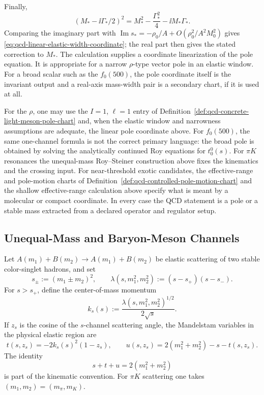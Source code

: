 Finally,
\[
  (M_\ast-\ii\Gamma_\ast/2)^2
  =
  M_\ast^2-\frac{\Gamma_\ast^2}{4}-\ii M_\ast\Gamma_\ast.
\]
Comparing the imaginary part with
\(\operatorname{Im}s_\ast=-\rho_0/A+O(\rho_0^2/A^2M_0^2)\) gives
\eqref{eq:qcd-linear-elastic-width-coordinate}; the real part then gives the
stated correction to \(M_\ast\).  The calculation supplies a coordinate
linearization of the pole equation.  It is appropriate for a narrow
\(\rho\)-type vector pole in an elastic window.  For a broad scalar such as
the \(f_0(500)\), the pole coordinate itself is the invariant output and a
real-axis mass-width pair is a secondary chart, if it is used at all.
\begin{remark}
For the \(\rho\), one may use the \(I=1\), \(\ell=1\) entry of
Definition~\ref{def:qcd-concrete-light-meson-pole-chart} and, when the
elastic window and narrowness assumptions are adequate, the linear pole
coordinate above.
For \(f_0(500)\), the same one-channel formula is not the correct primary
language: the broad pole is obtained by solving the analytically continued
Roy equations for \(t_0^0(s)\).  For \(\pi K\) resonances the unequal-mass
Roy--Steiner construction above fixes the kinematics and the crossing input.
For near-threshold exotic candidates, the effective-range and pole-motion
charts of Definition~\ref{def:qcd-controlled-pole-motion-chart} and the
shallow effective-range calculation above specify
what is meant by a molecular or compact coordinate.  In every case the QCD
statement is a pole or a stable mass extracted from a declared operator and
regulator setup.
\end{remark}

\subsection{Unequal-Mass and Baryon-Meson Channels}
\label{subsec:qcd-unequal-mass-baryon-meson-channels}

\begin{definition}
\label{def:qcd-unequal-mass-elastic-kinematics}
Let \(A(m_1)+B(m_2)\to A(m_1)+B(m_2)\) be elastic scattering of two stable
color-singlet hadrons, and set
\[
  s_\pm:=(m_1\pm m_2)^2,\qquad
  \lambda(s,m_1^2,m_2^2):=(s-s_+)(s-s_-).
\]
For \(s>s_+\), define the center-of-mass momentum
\[
  k_s(s):=\frac{\lambda(s,m_1^2,m_2^2)^{1/2}}{2\sqrt s}.
\]
If \(z_s\) is the cosine of the \(s\)-channel scattering angle, the
Mandelstam variables in the physical elastic region are
\begin{equation}
  t(s,z_s)=-2k_s(s)^2(1-z_s),
  \qquad
  u(s,z_s)=2(m_1^2+m_2^2)-s-t(s,z_s).
  \label{eq:qcd-unequal-mass-elastic-kinematics}
\end{equation}
The identity
\begin{equation}
  s+t+u=2(m_1^2+m_2^2)
  \label{eq:qcd-pik-mandelstam-sum}
\end{equation}
is part of the kinematic convention.  For \(\pi K\) scattering one takes
\((m_1,m_2)=(m_\pi,m_K)\).
\end{definition}


